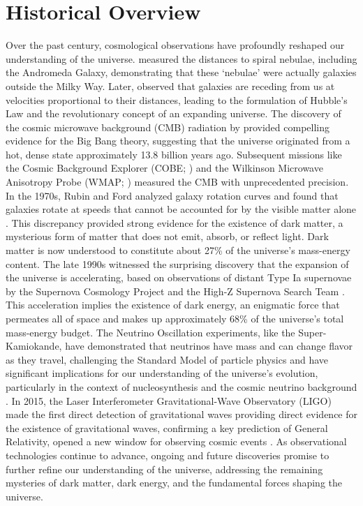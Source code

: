 \section{Historical Overview}
Over the past century, cosmological observations have profoundly reshaped our understanding of the universe. \citet{1925Obs....48..139H} measured the distances to spiral nebulae, including the Andromeda Galaxy, demonstrating that these `nebulae' were actually galaxies outside the Milky Way. Later, \citet{1929ApJ....69..103H} observed that galaxies are receding from us at velocities proportional to their distances, leading to the formulation of Hubble's Law and the revolutionary concept of an expanding universe. The discovery of the cosmic microwave background (CMB) radiation by \citet{1965ApJ...142..419P} provided compelling evidence for the Big Bang theory, suggesting that the universe originated from a hot, dense state approximately 13.8 billion years ago. Subsequent missions like the Cosmic Background Explorer (COBE; \citealt{1992ApJ...396L...1S}) and the Wilkinson Microwave Anisotropy Probe (WMAP; \citealt{2003ApJS..148...97B}) measured the CMB with unprecedented precision. In the 1970s, Rubin and Ford analyzed galaxy rotation curves and found that galaxies rotate at speeds that cannot be accounted for by the visible matter alone \citep{1970ApJ...159..379R, 1980ApJ...238..471R}. This discrepancy provided strong evidence for the existence of dark matter, a mysterious form of matter that does not emit, absorb, or reflect light. Dark matter is now understood to constitute about 27\% of the universe's mass-energy content. The late 1990s witnessed the surprising discovery that the expansion of the universe is accelerating, based on observations of distant Type Ia supernovae by the Supernova Cosmology Project and the High-Z Supernova Search Team \citep{1998AJ....116.1009R, 1999ApJ...517..565P}. This acceleration implies the existence of dark energy, an enigmatic force that permeates all of space and makes up approximately 68\% of the universe's total mass-energy budget. The Neutrino Oscillation experiments, like the Super-Kamiokande, have demonstrated that neutrinos have mass and can change flavor as they travel, challenging the Standard Model of particle physics and have significant implications for our understanding of the universe's evolution, particularly in the context of nucleosynthesis and the cosmic neutrino background \citep{1998PhRvL..81.1562F, 2001PhRvL..87g1301A}. In 2015, the Laser Interferometer Gravitational-Wave Observatory (LIGO) made the first direct detection of gravitational waves providing direct evidence for the existence of gravitational waves, confirming a key prediction of General Relativity, opened a new window for observing cosmic events \citep{2016PhRvL.116f1102A}. As observational technologies continue to advance, ongoing and future discoveries promise to further refine our understanding of the universe, addressing the remaining mysteries of dark matter, dark energy, and the fundamental forces shaping the universe.


